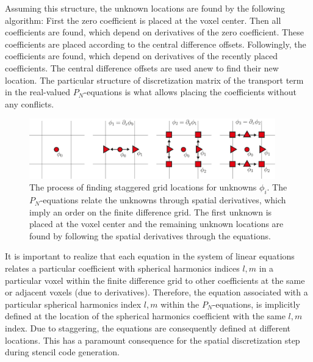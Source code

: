 Assuming this structure, the unknown locations are found by the following algorithm: First the zero coefficient is placed at the voxel center. Then all coefficients are found, which depend on derivatives of the zero coefficient. These coefficients are placed according to the central difference offsets. Followingly, the coefficients are found, which depend on derivatives of the recently placed coefficients. The central difference offsets are used anew to find their new location. The particular structure of discretization matrix of the transport term in the real-valued $P_N$-equations is what allows placing the coefficients without any conflicts. 
\begin{figure}[h]
\centering
\includegraphics[width=0.95\textwidth]{04_pn_method/figures/fig_staggered_grid_finding_locations.pdf}
\caption{The process of finding staggered grid locations for unknowns $\phi_i$. The $P_N$-equations relate the unknowns through spatial derivatives, which imply an order on the finite difference grid. The first unknown is placed at the voxel center and the remaining unknown locations are found by following the spatial derivatives through the equations.}
\label{fig:staggered_grid_placement}
\end{figure}

It is important to realize that each equation in the system of linear equations relates a particular coefficient with spherical harmonics indices $l,m$ in a particular voxel within the finite difference grid to other coefficients at the same or adjacent voxels (due to derivatives). Therefore, the equation associated with a particular spherical harmonics index $l,m$ within the $P_N$-equations, is implicitly defined at the location of the spherical harmonics coefficient with the same $l,m$ index. Due to staggering, the equations are consequently defined at different locations. This has a paramount consequence for the spatial discretization step during stencil code generation.

